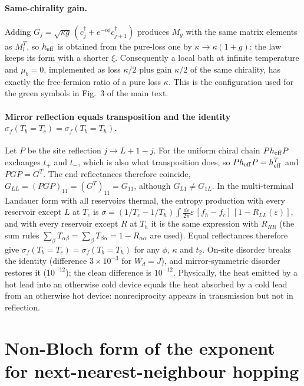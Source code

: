 \documentclass[reprint,aps,prl,superscriptaddress,nofootinbib,floatfix]{revtex4-2}
\newcommand{\heff}{h_{\rm eff}}
\begin{document}
\paragraph{Same-chirality gain.}
Adding $G_j=\sqrt{\kappa g}\,(c_j^\dagger+e^{-i\phi}c_{j+1}^\dagger)$ produces $M_g$ with the same matrix elements as $M_l^{T}$, so $\heff$ is obtained from the pure-loss one by $\kappa\to\kappa(1+g)$: the law keeps its form with a shorter $\xi$. Consequently a local bath at infinite temperature and $\mu_b=0$, implemented as loss $\kappa/2$ plus gain $\kappa/2$ of the same chirality, has exactly the free-fermion ratio of a pure loss $\kappa$. This is the configuration used for the green symbols in Fig.~3 of the main text.

\paragraph{Mirror reflection equals transposition and the identity $\sigma_f(T_b=T_c)=\sigma_f(T_b=T_h)$.}
Let $P$ be the site reflection $j\to L+1-j$. For the uniform chiral chain $P\heff P$ exchanges $t_+$ and $t_-$, which is also what transposition does, so $P\heff P=\heff^{T}$ and $P G P=G^{T}$. The end reflectances therefore coincide, $G_{LL}=(PGP)_{11}=(G^{T})_{11}=G_{11}$, although $G_{L1}\neq G_{1L}$. In the multi-terminal Landauer form with all reservoirs thermal, the entropy production with every reservoir except $L$ at $T_c$ is $\sigma=(1/T_c-1/T_h)\int\frac{d\varepsilon}{2\pi}\varepsilon\,[f_h-f_c]\,[1-R_{LL}(\varepsilon)]$, and with every reservoir except $R$ at $T_h$ it is the same expression with $R_{RR}$ (the sum rules $\sum_\beta T_{\alpha\beta}=\sum_\beta T_{\beta\alpha}=1-R_{\alpha\alpha}$ are used). Equal reflectances therefore give $\sigma_f(T_b=T_c)=\sigma_f(T_b=T_h)$ for any $\phi$, $\kappa$ and $t_2$. On-site disorder breaks the identity (difference $3\times10^{-3}$ for $W_d=J$), and mirror-symmetric disorder restores it ($10^{-12}$); the clean difference is $10^{-12}$. Physically, the heat emitted by a hot lead into an otherwise cold device equals the heat absorbed by a cold lead from an otherwise hot device: nonreciprocity appears in transmission but not in reflection.

\section{Non-Bloch form of the exponent for next-nearest-neighbour hopping}
\label{sec:nonbloch}
\end{document}
